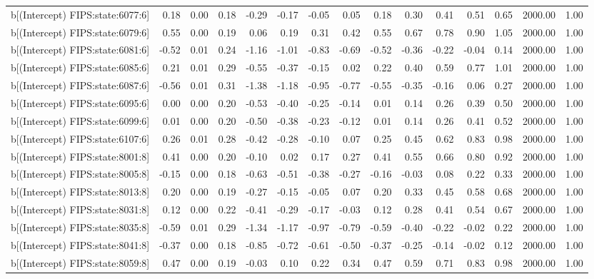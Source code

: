 \begin{table}[ht]
\begin{tabular}{rrrrrrrrrrrrrrr}
  b[(Intercept) FIPS:state:6077:6] & 0.18 & 0.00 & 0.18 & -0.29 & -0.17 & -0.05 & 0.05 & 0.18 & 0.30 & 0.41 & 0.51 & 0.65 & 2000.00 & 1.00 \\ 
  b[(Intercept) FIPS:state:6079:6] & 0.55 & 0.00 & 0.19 & 0.06 & 0.19 & 0.31 & 0.42 & 0.55 & 0.67 & 0.78 & 0.90 & 1.05 & 2000.00 & 1.00 \\ 
  b[(Intercept) FIPS:state:6081:6] & -0.52 & 0.01 & 0.24 & -1.16 & -1.01 & -0.83 & -0.69 & -0.52 & -0.36 & -0.22 & -0.04 & 0.14 & 2000.00 & 1.00 \\ 
  b[(Intercept) FIPS:state:6085:6] & 0.21 & 0.01 & 0.29 & -0.55 & -0.37 & -0.15 & 0.02 & 0.22 & 0.40 & 0.59 & 0.77 & 1.01 & 2000.00 & 1.00 \\ 
  b[(Intercept) FIPS:state:6087:6] & -0.56 & 0.01 & 0.31 & -1.38 & -1.18 & -0.95 & -0.77 & -0.55 & -0.35 & -0.16 & 0.06 & 0.27 & 2000.00 & 1.00 \\ 
  b[(Intercept) FIPS:state:6095:6] & 0.00 & 0.00 & 0.20 & -0.53 & -0.40 & -0.25 & -0.14 & 0.01 & 0.14 & 0.26 & 0.39 & 0.50 & 2000.00 & 1.00 \\ 
  b[(Intercept) FIPS:state:6099:6] & 0.01 & 0.00 & 0.20 & -0.50 & -0.38 & -0.23 & -0.12 & 0.01 & 0.14 & 0.26 & 0.41 & 0.52 & 2000.00 & 1.00 \\ 
  b[(Intercept) FIPS:state:6107:6] & 0.26 & 0.01 & 0.28 & -0.42 & -0.28 & -0.10 & 0.07 & 0.25 & 0.45 & 0.62 & 0.83 & 0.98 & 2000.00 & 1.00 \\ 
  b[(Intercept) FIPS:state:8001:8] & 0.41 & 0.00 & 0.20 & -0.10 & 0.02 & 0.17 & 0.27 & 0.41 & 0.55 & 0.66 & 0.80 & 0.92 & 2000.00 & 1.00 \\ 
  b[(Intercept) FIPS:state:8005:8] & -0.15 & 0.00 & 0.18 & -0.63 & -0.51 & -0.38 & -0.27 & -0.16 & -0.03 & 0.08 & 0.22 & 0.33 & 2000.00 & 1.00 \\ 
  b[(Intercept) FIPS:state:8013:8] & 0.20 & 0.00 & 0.19 & -0.27 & -0.15 & -0.05 & 0.07 & 0.20 & 0.33 & 0.45 & 0.58 & 0.68 & 2000.00 & 1.00 \\ 
  b[(Intercept) FIPS:state:8031:8] & 0.12 & 0.00 & 0.22 & -0.41 & -0.29 & -0.17 & -0.03 & 0.12 & 0.28 & 0.41 & 0.54 & 0.67 & 2000.00 & 1.00 \\ 
  b[(Intercept) FIPS:state:8035:8] & -0.59 & 0.01 & 0.29 & -1.34 & -1.17 & -0.97 & -0.79 & -0.59 & -0.40 & -0.22 & -0.02 & 0.22 & 2000.00 & 1.00 \\ 
  b[(Intercept) FIPS:state:8041:8] & -0.37 & 0.00 & 0.18 & -0.85 & -0.72 & -0.61 & -0.50 & -0.37 & -0.25 & -0.14 & -0.02 & 0.12 & 2000.00 & 1.00 \\ 
  b[(Intercept) FIPS:state:8059:8] & 0.47 & 0.00 & 0.19 & -0.03 & 0.10 & 0.22 & 0.34 & 0.47 & 0.59 & 0.71 & 0.83 & 0.98 & 2000.00 & 1.00 \\ 

\end{tabular}
\end{table}
